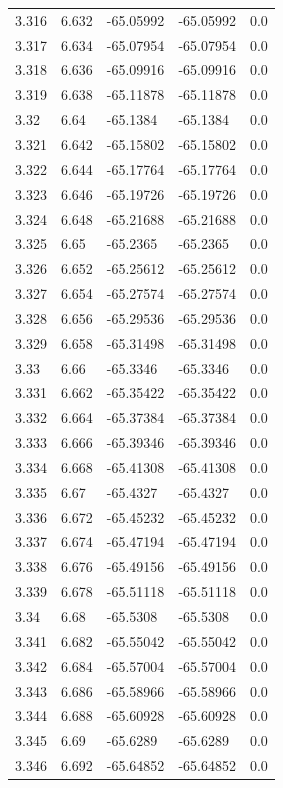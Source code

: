 \begin{tabular}{lllll}
3.316 & 6.632 & -65.05992 & -65.05992 & 0.0 \\
3.317 & 6.634 & -65.07954 & -65.07954 & 0.0 \\
3.318 & 6.636 & -65.09916 & -65.09916 & 0.0 \\
3.319 & 6.638 & -65.11878 & -65.11878 & 0.0 \\
3.32 & 6.64 & -65.1384 & -65.1384 & 0.0 \\
3.321 & 6.642 & -65.15802 & -65.15802 & 0.0 \\
3.322 & 6.644 & -65.17764 & -65.17764 & 0.0 \\
3.323 & 6.646 & -65.19726 & -65.19726 & 0.0 \\
3.324 & 6.648 & -65.21688 & -65.21688 & 0.0 \\
3.325 & 6.65 & -65.2365 & -65.2365 & 0.0 \\
3.326 & 6.652 & -65.25612 & -65.25612 & 0.0 \\
3.327 & 6.654 & -65.27574 & -65.27574 & 0.0 \\
3.328 & 6.656 & -65.29536 & -65.29536 & 0.0 \\
3.329 & 6.658 & -65.31498 & -65.31498 & 0.0 \\
3.33 & 6.66 & -65.3346 & -65.3346 & 0.0 \\
3.331 & 6.662 & -65.35422 & -65.35422 & 0.0 \\
3.332 & 6.664 & -65.37384 & -65.37384 & 0.0 \\
3.333 & 6.666 & -65.39346 & -65.39346 & 0.0 \\
3.334 & 6.668 & -65.41308 & -65.41308 & 0.0 \\
3.335 & 6.67 & -65.4327 & -65.4327 & 0.0 \\
3.336 & 6.672 & -65.45232 & -65.45232 & 0.0 \\
3.337 & 6.674 & -65.47194 & -65.47194 & 0.0 \\
3.338 & 6.676 & -65.49156 & -65.49156 & 0.0 \\
3.339 & 6.678 & -65.51118 & -65.51118 & 0.0 \\
3.34 & 6.68 & -65.5308 & -65.5308 & 0.0 \\
3.341 & 6.682 & -65.55042 & -65.55042 & 0.0 \\
3.342 & 6.684 & -65.57004 & -65.57004 & 0.0 \\
3.343 & 6.686 & -65.58966 & -65.58966 & 0.0 \\
3.344 & 6.688 & -65.60928 & -65.60928 & 0.0 \\
3.345 & 6.69 & -65.6289 & -65.6289 & 0.0 \\
3.346 & 6.692 & -65.64852 & -65.64852 & 0.0 \\

\end{tabular}
